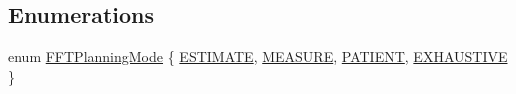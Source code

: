 \subsection*{Enumerations}
\begin{DoxyCompactItemize}
\item 
enum \hyperlink{namespacetsa_a217e07ef78939f88b22c8428ac96b1ae}{F\+F\+T\+Planning\+Mode} \{ \hyperlink{namespacetsa_a217e07ef78939f88b22c8428ac96b1aea2762be66fb6f3e4772c7f4cc162b9750}{E\+S\+T\+I\+M\+A\+TE}, 
\hyperlink{namespacetsa_a217e07ef78939f88b22c8428ac96b1aea80ceffb25eed9ce8d5feb206e07e4bf7}{M\+E\+A\+S\+U\+RE}, 
\hyperlink{namespacetsa_a217e07ef78939f88b22c8428ac96b1aea77edd9a03467f5b216486d40b0b5f3c5}{P\+A\+T\+I\+E\+NT}, 
\hyperlink{namespacetsa_a217e07ef78939f88b22c8428ac96b1aea47f96dc544971b3c53115a87a8fd8e02}{E\+X\+H\+A\+U\+S\+T\+I\+VE}
 \}
\end{DoxyCompactItemize}
